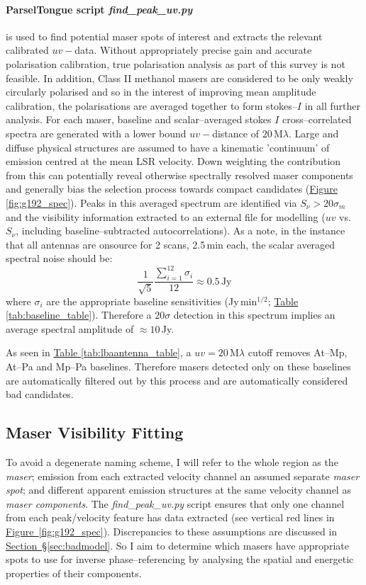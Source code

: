         \paragraph{ParselTongue script \textit{find\_peak\_uv.py}} 
        is used to find potential maser spots of interest and extracts the relevant calibrated $uv-$data. Without appropriately precise gain and accurate polarisation calibration, true polarisation analysis as part of this survey is not feasible. In addition, Class II methanol masers are considered to be only weakly circularly polarised \citep[$<1\%$; ][]{Stack2011} and so in the interest of improving mean amplitude calibration, the polarisations are averaged together to form stokes--$I$ in all further analysis.
        For each maser, baseline and scalar--averaged stokes $I$ cross--correlated spectra are generated with a lower bound $uv-$distance of $20$\,M$\lambda$. Large and diffuse physical structures are assumed to have a kinematic 'continuum' of emission centred at the mean LSR velocity. Down weighting the contribution from this can potentially reveal otherwise spectrally resolved maser components and generally bias the selection process towards compact candidates (\hyperref[fig:g192_spec]{Figure \ref*{fig:g192_spec}}). Peaks in this averaged spectrum are identified via $S_\nu>20\sigma_m$ and the visibility information extracted to an external file for modelling ($uv$ vs. $S_\nu$, including baseline--subtracted autocorrelations). As a note, in the instance that all antennas are onsource for 2 scans, 2.5\,min each, the scalar averaged spectral noise should be: $$\frac{1}{\sqrt{5}}\frac{\sum_{i=1}^{12}\sigma_i}{12}\approx0.5\,\text{Jy}$$ where $\sigma_i$ are the appropriate baseline sensitivities (Jy\,min$^{1/2}$; \hyperref[tab:baseline_table]{Table \ref*{tab:baseline_table}}). Therefore a $20\sigma$ detection in this spectrum implies an average spectral amplitude of $\approx10$\,Jy.
        
        As seen in \hyperref[tab:lbaantenna_table]{Table \ref*{tab:lbaantenna_table}}, a $uv=20$\,M$\lambda$ cutoff removes At--Mp, At--Pa and Mp--Pa baselines. Therefore masers detected only on these baselines are automatically filtered out by this process and are automatically considered bad candidates.
    \subsection{Maser Visibility Fitting} \label{sec:analysis}
        To avoid a degenerate naming scheme, I will refer to the whole region as the {\it maser}; emission from each extracted velocity channel an assumed separate {\it maser spot}; and different apparent emission structures at the same velocity channel as {\it maser components}. The \textit{find\_peak\_uv.py} script ensures that only one channel from each peak/velocity feature has data extracted (see vertical red lines in \hyperref[fig:g192_spec]{Figure~\ref*{fig:g192_spec}}). Discrepancies to these assumptions are discussed in \hyperref[sec:badmodel]{Section~\S\ref*{sec:badmodel}}. So I aim to determine which masers have appropriate spots to use for inverse phase--referencing by analysing the spatial and energetic properties of their components.
        
